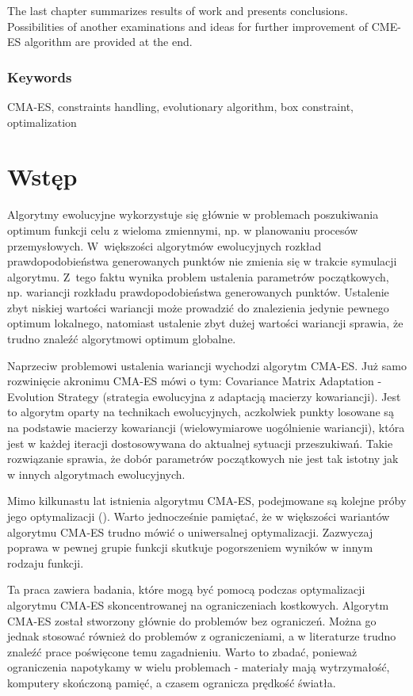 \documentclass{mini}
\begin{document}
The last chapter summarizes results of work and presents conclusions. Possibilities of another examinations and ideas for further improvement of CME-ES algorithm are provided at the end.

\subsubsection*{Keywords}
CMA-ES, constraints handling, evolutionary algorithm, box constraint, optimalization

\pagebreak

\section{Wstęp}
\hspace{3,4ex}Algorytmy ewolucyjne wykorzystuje się głównie w problemach poszukiwania optimum funkcji celu z wieloma zmiennymi, np. w planowaniu procesów przemysłowych.\cite{zast} W~większości algorytmów ewolucyjnych rozkład prawdopodobieństwa generowanych punktów nie zmienia się w trakcie symulacji algorytmu. Z~tego faktu wynika problem ustalenia parametrów początkowych, np. wariancji rozkładu prawdopodobieństwa generowanych punktów. Ustalenie zbyt niskiej wartości wariancji może prowadzić do znalezienia jedynie pewnego optimum lokalnego, natomiast ustalenie zbyt dużej wartości wariancji sprawia, że trudno znaleźć algorytmowi optimum globalne.

Naprzeciw problemowi ustalenia wariancji wychodzi algorytm CMA-ES. Już samo rozwinięcie akronimu CMA-ES mówi o tym: Covariance Matrix Adaptation - Evolution Strategy (strategia ewolucyjna z adaptacją macierzy kowariancji). Jest to algorytm oparty na technikach ewolucyjnych, aczkolwiek punkty losowane są na podstawie macierzy kowariancji (wielowymiarowe uogólnienie wariancji), która jest w każdej iteracji dostosowywana do aktualnej sytuacji przeszukiwań. Takie rozwiązanie sprawia, że dobór parametrów początkowych nie jest tak istotny jak w innych algorytmach ewolucyjnych.

Mimo kilkunastu lat istnienia algorytmu CMA-ES, podejmowane są kolejne próby jego optymalizacji (\cite{magist}\cite{lcmaes}). Warto jednocześnie pamiętać, że w większości wariantów algorytmu CMA-ES trudno mówić o uniwersalnej optymalizacji. Zazwyczaj poprawa w pewnej grupie funkcji skutkuje pogorszeniem wyników w innym rodzaju funkcji.

Ta praca zawiera badania, które mogą być pomocą podczas optymalizacji algorytmu CMA-ES skoncentrowanej na ograniczeniach kostkowych. Algorytm CMA-ES został stworzony głównie do problemów bez ograniczeń. Można go jednak stosować również do problemów z ograniczeniami, a w literaturze trudno znaleźć prace poświęcone temu zagadnieniu. Warto to zbadać, ponieważ ograniczenia napotykamy w wielu problemach - materiały mają wytrzymałość, komputery skończoną pamięć, a czasem ogranicza prędkość światła.
\end{document}
